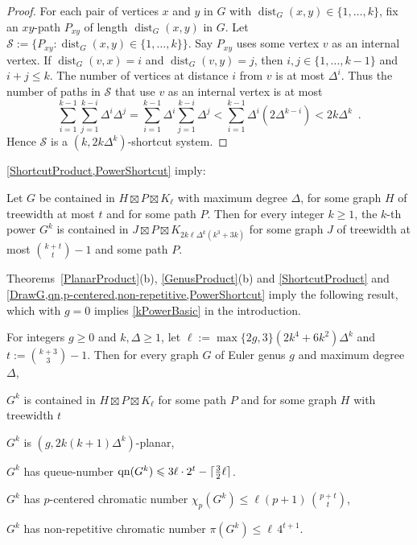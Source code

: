 \documentclass{patmorin}
\DeclareMathOperator{\dist}{dist}
\DeclareMathOperator{\qn}{qn}
\DeclarePairedDelimiter{\ceil}{\lceil}{\rceil}
\renewcommand{\SS}{\mathcal{S}}
\renewcommand{\geq}{\geqslant}
\renewcommand{\leq}{\leqslant}
\begin{document}
\begin{proof}
For each pair of vertices $x$ and $y$ in $G$ with $\dist_G(x,y)\in\{1,\dots,k\}$, fix an $xy$-path $P_{xy}$ of length
$\dist_G(x,y)$  in $G$. Let $\SS:=\{P_{xy}: \dist_G(x,y)\in\{1,\dots,k\} \}$. Say $P_{xy}$ uses some vertex $v$ as an internal vertex. If $\dist_G(v,x)=i$ and $\dist_G(v,y)=j$, then $i,j\in\{1,\dots,k-1\}$ and $i+j\leq k$. The number of vertices at distance $i$ from $v$ is at most $\Delta^i$. Thus the number of paths in $\SS$ that use $v$ as an internal vertex is at most
\[\sum_{i=1}^{k-1} \sum_{j=1}^{k-i} \Delta^i\Delta^j
= \sum_{i=1}^{k-1} \Delta^i \sum_{j=1}^{k-i} \Delta^j
< \sum_{i=1}^{k-1} \Delta^i ( 2 \Delta^{k-i} )
< 2k \Delta^k\enspace.\]
Hence $\SS$ is a $(k, 2k \Delta^k)$-shortcut system.
\end{proof}

\cref{ShortcutProduct,PowerShortcut} imply:

\begin{thm}
\label{PowerProduct}
Let $G$ be contained in $H\boxtimes P\boxtimes K_\ell$ with maximum degree $\Delta$, for some graph $H$ of treewidth at most $t$ and for some path $P$. Then for every integer $k\geq 1$, the $k$-th power $G^k$ is contained in $J\boxtimes P\boxtimes K_{2k \ell \Delta^{k}(k^3+3k)}$ for some graph $J$ of treewidth at most $\binom{k+t}{t}-1$ and some path $P$.
\end{thm}


Theorems~\ref{PlanarProduct}(b), \ref{GenusProduct}(b) and \cref{ShortcutProduct} and  \cref{DrawG,qn,p-centered,non-repetitive,PowerShortcut} imply the following result, which with $g=0$ implies  \cref{kPowerBasic} in the introduction.

\begin{thm}
\label{PowerGenus}
For integers $g\geq 0$ and $k,\Delta\geq 1$, let $\ell:= \max\{2g,3\} (2k^4+6k^2) \Delta^{k}$ and $t:= \binom{k+3}{3}-1$. Then for every graph $G$ of Euler genus $g$ and maximum degree $\Delta$,
\begin{compactitem}
\item $G^k$ is contained in $H\boxtimes P \boxtimes K_{\ell}$ for some path $P$ and for some graph $H$ with treewidth $t$
\item $G^k$ is $(g, 2k(k+1)\Delta^{k} )$-planar,
\item $G^k$ has queue-number $\qn(G^k) \leq 3 \ell \cdot 2^t - \ceil{\tfrac{3}{2}\ell}$.
\item $G^k$ has  $p$-centered chromatic number $\chi_p(G^k) \leq \ell (p+1)\,  \binom{p+t}{t}$,
\item $G^k$ has  non-repetitive chromatic number $ \pi(G^k) \leq \ell \, 4^{t+1}$.
\end{compactitem}
\end{thm}
\end{document}
